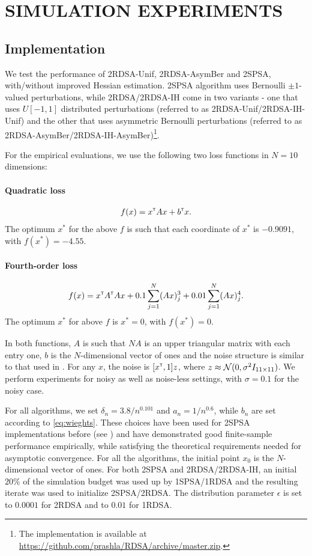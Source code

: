 \documentclass[letterpaper, 10 pt, conference]{ieeeconf}  %
\begin{document}
\section{SIMULATION EXPERIMENTS}
\label{sec:expts}
\subsection{Implementation}
We test the performance of 2RDSA-Unif, 2RDSA-AsymBer and 2SPSA, with/without improved Hessian estimation. 
2SPSA algorithm uses Bernoulli $\pm 1$-valued perturbations, while 2RDSA/2RDSA-IH come in two variants - one that uses $U[-1,1]$ distributed perturbations (referred to as 2RDSA-Unif/2RDSA-IH-Unif) and the other that uses asymmetric Bernoulli perturbations (referred to as 2RDSA-AsymBer/2RDSA-IH-AsymBer)\footnote{The implementation is available at \url{https://github.com/prashla/RDSA/archive/master.zip}.}.

For the empirical evaluations, we use the following two loss functions in $N=10$ dimensions:
\paragraph{Quadratic loss}
\begin{align}
f(x) = x^\mathsf{\scriptscriptstyle T} A x + b^\mathsf{\scriptscriptstyle T} x.\label{eq:quadratic}
\end{align} 
The optimum $x^*$ for the above $f$ is such that each coordinate of $x^*$ is $-0.9091$, with $f(x^*) = -4.55$.

\paragraph{Fourth-order loss}
\begin{align} 
f(x) = x^\mathsf{\scriptscriptstyle T} A^\mathsf{\scriptscriptstyle T} A x + 0.1 \sum_{j=1}^N (Ax)^3_j + 0.01 \sum_{j=1}^N (Ax)^4_j.\label{eq:4thorder}
 \end{align} 
The optimum $x^*$ for above $f$ is $x^*=0$, with $f(x^*) = 0$. 

In both functions, $A$ is such that $NA$ is an upper triangular matrix with each entry one, $b$ is the $N$-dimensional vector of ones and the noise structure is similar to that used in \cite{spall_adaptive}. For any $x$, the noise is $[x^\mathsf{\scriptscriptstyle T}, 1]z$, where $z \approx \mathcal{N}(0,\sigma^2 I_{11\times11})$. We perform experiments for noisy as well as noise-less settings, with $\sigma=0.1$ for the noisy case. 



For all algorithms, we set $\delta_n = 3.8/n^{0.101}$ and $a_n = 1/n^{0.6}$, while $b_n$ are set according to \eqref{eq:wieghts}. These choices have been used  for 2SPSA implementations before (see \cite{spall_adaptive}) and have demonstrated good finite-sample performance empirically, while satisfying the theoretical requirements needed for asymptotic convergence.  For all the algorithms, the initial point $x_0$ is the $N$-dimensional vector of ones.  For both 2SPSA and 2RDSA/2RDSA-IH, an initial $20\%$ of the  simulation budget was used up by 1SPSA/1RDSA and the resulting iterate was used to initialize 2SPSA/2RDSA. The distribution parameter $\epsilon$ is set to $0.0001$ for 2RDSA and to $0.01$ for 1RDSA. 
\end{document}
